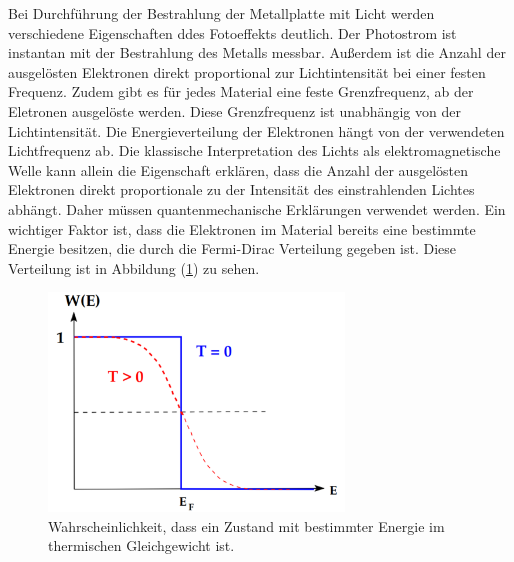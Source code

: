 Bei Durchführung der Bestrahlung der Metallplatte mit Licht werden 
verschiedene Eigenschaften ddes Fotoeffekts deutlich. 
Der Photostrom ist instantan mit der Bestrahlung des Metalls messbar.
Außerdem ist die Anzahl der ausgelösten Elektronen direkt proportional zur Lichtintensität 
bei einer festen Frequenz.
Zudem gibt es für jedes Material eine feste Grenzfrequenz, ab der Eletronen ausgelöste 
werden. Diese Grenzfrequenz ist unabhängig von der Lichtintensität. 
Die Energieverteilung der Elektronen hängt von der verwendeten Lichtfrequenz ab. 
Die klassische Interpretation des Lichts als elektromagnetische Welle 
kann allein die Eigenschaft erklären, dass die Anzahl der ausgelösten
Elektronen direkt proportionale zu der Intensität des einstrahlenden 
Lichtes abhängt. Daher müssen quantenmechanische Erklärungen verwendet werden. 
Ein wichtiger Faktor ist, dass die Elektronen im Material bereits eine 
bestimmte Energie besitzen, die durch die Fermi-Dirac Verteilung gegeben ist. 
Diese Verteilung ist in Abbildung (\ref{fig:Fermi_Dirac}) zu sehen. 
\begin{figure}[H]
    \centering
    \includegraphics[width=0.7\textwidth]{content/Bilder/Fermi_Dirac.png}
    \caption{Wahrscheinlichkeit, dass ein Zustand mit bestimmter Energie im thermischen Gleichgewicht ist.}
    \label{fig:Fermi_Dirac}
  \end{figure}

